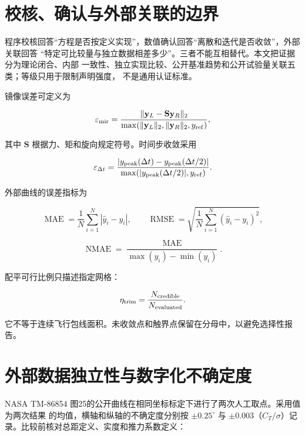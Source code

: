 \documentclass[UTF8,12pt,oneside,openany,fontset=windows]{ctexbook}
\begin{document}
\section{校核、确认与外部关联的边界}

程序校核回答“方程是否按定义实现”，数值确认回答“离散和迭代是否收敛”，外部关联回答 “特定可比较量与独立数据相差多少”。三者不能互相替代。本文把证据分为理论闭合、内部 一致性、独立实现比较、公开基准趋势和公开试验量关联五类；等级只用于限制声明强度， 不是通用认证标准。

镜像误差可定义为

\begin{equation}
\varepsilon_{\rm mir}=
\frac{\|\mathbf y_L-\mathbf S\mathbf y_R\|_2}
{\max(\|\mathbf y_L\|_2,\|\mathbf y_R\|_2,y_{\rm ref})},
\end{equation}

其中 \(\mathbf S\) 根据力、矩和旋向规定符号。时间步收敛采用

\begin{equation}
\varepsilon_{\Delta t}=
\frac{|y_{\rm peak}(\Delta t)-y_{\rm peak}(\Delta t/2)|}
{\max(|y_{\rm peak}(\Delta t/2)|,y_{\rm ref})}.
\end{equation}

外部曲线的误差指标为

\begin{equation}
\operatorname{MAE}=\frac1N\sum_{i=1}^N|\hat y_i-y_i|,\qquad
\operatorname{RMSE}=\sqrt{\frac1N\sum_{i=1}^N(\hat y_i-y_i)^2},
\end{equation}

\begin{equation}
\operatorname{NMAE}=\frac{\operatorname{MAE}}{\max(y_i)-\min(y_i)}.
\end{equation}

配平可行比例只描述指定网格：

\begin{equation}
\eta_{\rm trim}=\frac{N_{\rm credible}}{N_{\rm evaluated}}.
\end{equation}

它不等于连续飞行包线面积。未收敛点和触界点保留在分母中，以避免选择性报告。

\section{外部数据独立性与数字化不确定度}

NASA TM-86854 图25的公开曲线在相同坐标标定下进行了两次人工取点。采用值为两次结果 的均值，横轴和纵轴的不确定度分别按 \(\pm0.25^\circ\) 与 \(\pm0.003\)（\(C_T/\sigma\)）记录。比较前核对总距定义、实度和推力系数定义：
\end{document}

